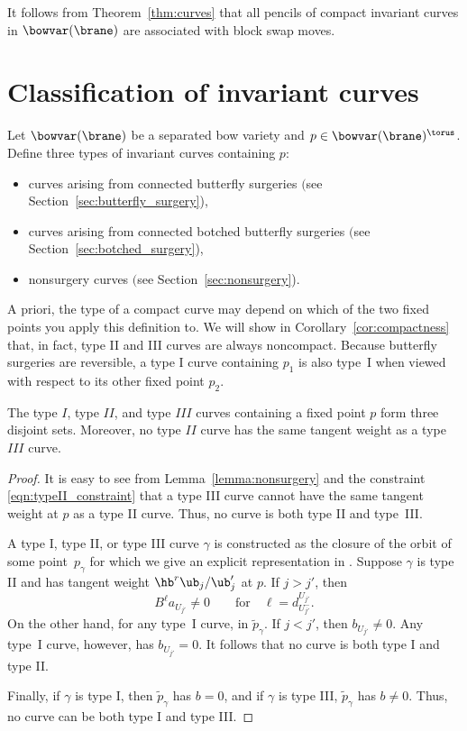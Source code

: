 It follows from Theorem~\ref{thm:curves} that all pencils of compact invariant curves in $\bowvar(\brane)$ are associated with block swap moves.


\section{Classification of invariant curves} \label{sec:classification}
\begin{Definition}
Let $\bowvar(\brane)$ be a separated bow variety and $p\in\bowvar(\brane)^\torus$. Define three types of invariant curves containing $p$:
\begin{itemize}\itemsep=0pt
\item[$\rm I)$] curves arising from connected butterfly surgeries $($see Section~{\rm\ref{sec:butterfly_surgery})},
\item[$\rm II)$] curves arising from connected botched butterfly surgeries $($see Section~{\rm\ref{sec:botched_surgery})},
\item[$\rm III)$] nonsurgery curves $($see Section~{\rm\ref{sec:nonsurgery})}.
\end{itemize}
\end{Definition}
A priori, the type of a compact curve may depend on which of the two fixed points you apply this definition to. We will show in Corollary~\ref{cor:compactness} that, in fact, type II and III curves are always noncompact. Because butterfly surgeries are reversible, a type I curve containing $p_1$ is also type~I when viewed with respect to its other fixed point $p_2$.

\begin{Proposition} \label{prop:disjoint_types}
The type $I$, type $II$, and type $III$ curves containing a fixed point $p$ form three disjoint sets. Moreover, no type $II$ curve has the same tangent weight as a type $III$ curve.
\end{Proposition}

\begin{proof}
It is easy to see from Lemma~\ref{lemma:nonsurgery} and the constraint \eqref{eqn:typeII_constraint} that a type III curve cannot have the same tangent weight at $p$ as a type II curve. Thus, no curve is both type II and type~III.

A type I, type II, or type III curve $\gamma$ is constructed as the closure of the orbit of some point~$p_\gamma$ for which we give an explicit representation in . Suppose $\gamma$ is type II and has tangent weight $\hb^r \ub_j/\ub_j'$ at $p$. If $j > j'$, then
\[
B^\ell a_{U_{j'}} \neq 0 \qquad \text{for} \quad \ell = d_{U_{j'}^-}^{U_{j'}}.
\]
On the other hand, for any type~I curve,  in $\tilde{p}_\gamma$. If $j < j'$, then $b_{U_{j'}} \neq 0$. Any type~I curve, however, has $b_{U_{j'}} = 0$. It follows that no curve is both type I and type II.

Finally, if $\gamma$ is type I, then $\tilde{p}_\gamma$ has $b=0$, and if $\gamma$ is type III, $\tilde{p}_\gamma$ has $b\neq 0$. Thus, no curve can be both type I and type III.
\end{proof}


